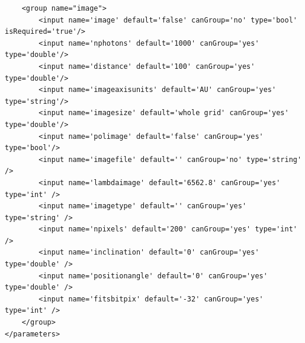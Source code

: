 \documentclass[a4paper,10pt]{article}
\begin{document}
\begin{lstlisting}
    <group name="image">
        <input name='image' default='false' canGroup='no' type='bool' isRequired='true'/>
        <input name='nphotons' default='1000' canGroup='yes' type='double'/>
        <input name='distance' default='100' canGroup='yes' type='double'/>
        <input name='imageaxisunits' default='AU' canGroup='yes' type='string'/>
        <input name='imagesize' default='whole grid' canGroup='yes' type='double'/>
        <input name='polimage' default='false' canGroup='yes' type='bool'/>
        <input name='imagefile' default='' canGroup='no' type='string' />
        <input name='lambdaimage' default='6562.8' canGroup='yes' type='int' />
        <input name='imagetype' default='' canGroup='yes' type='string' />
        <input name='npixels' default='200' canGroup='yes' type='int' />
        <input name='inclination' default='0' canGroup='yes' type='double' />
        <input name='positionangle' default='0' canGroup='yes' type='double' />
        <input name='fitsbitpix' default='-32' canGroup='yes' type='int' />
    </group>
</parameters>

\end{lstlisting}
\end{document}
